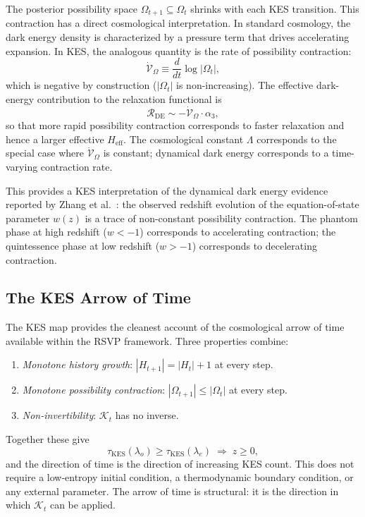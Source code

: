 \documentclass[12pt,a4paper]{article}
\theoremstyle{remark}
\newcommand{\Rcal}{\mathcal{R}}
\begin{document}
The posterior possibility space $\Omega_{t+1} \subseteq \Omega_t$ shrinks
with each KES transition. This contraction has a direct cosmological
interpretation. In standard cosmology, the dark energy density is
characterized by a pressure term that drives accelerating expansion. In KES,
the analogous quantity is the rate of possibility contraction:
\begin{equation}
\dot{\mathcal{V}}_\Omega \equiv \frac{d}{dt}\log|\Omega_t|,
\end{equation}
which is negative by construction ($|\Omega_t|$ is non-increasing).
The effective dark-energy contribution to the relaxation functional is
\begin{equation}
\Rcal_{\mathrm{DE}} \sim -\dot{\mathcal{V}}_\Omega \cdot \alpha_3,
\label{eq:kes_de}
\end{equation}
so that more rapid possibility contraction corresponds to faster relaxation
and hence a larger effective $H_{\mathrm{eff}}$. The cosmological constant
$\Lambda$ corresponds to the special case where $\dot{\mathcal{V}}_\Omega$
is constant; dynamical dark energy corresponds to a time-varying contraction
rate.

This provides a KES interpretation of the dynamical dark energy evidence
reported by Zhang et al.~\cite{zhang2026}: the observed redshift evolution
of the equation-of-state parameter $w(z)$ is a trace of non-constant
possibility contraction. The phantom phase at high redshift ($w < -1$)
corresponds to accelerating contraction; the quintessence phase at low
redshift ($w > -1$) corresponds to decelerating contraction.

\subsection{The KES Arrow of Time}

The KES map provides the cleanest account of the cosmological arrow of time
available within the RSVP framework. Three properties combine:
\begin{enumerate}[leftmargin=2em]
\item \emph{Monotone history growth}: $|H_{t+1}| = |H_t| + 1$ at every step.
\item \emph{Monotone possibility contraction}: $|\Omega_{t+1}| \le |\Omega_t|$
  at every step.
\item \emph{Non-invertibility}: $\mathcal{K}_t$ has no inverse.
\end{enumerate}
Together these give
\begin{equation}
\tau_{\mathrm{KES}}(\lambda_o) \ge \tau_{\mathrm{KES}}(\lambda_e)
\;\Longrightarrow\; z \ge 0,
\end{equation}
and the direction of time is the direction of increasing KES count. This does
not require a low-entropy initial condition, a thermodynamic boundary
condition, or any external parameter. The arrow of time is structural: it is
the direction in which $\mathcal{K}_t$ can be applied.
\end{document}
